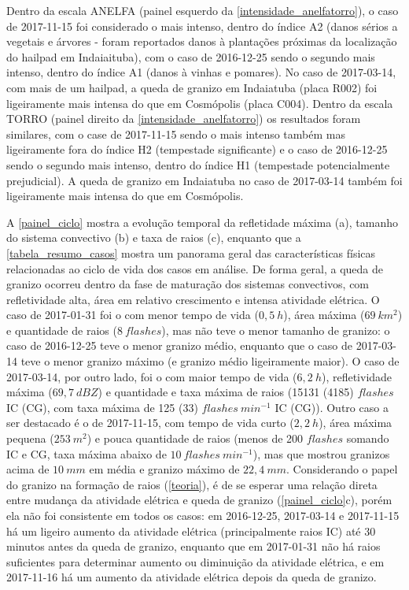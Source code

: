 Dentro da escala ANELFA (painel esquerdo da \autoref{intensidade_anelfatorro}), o caso de 2017-11-15 foi considerado o mais intenso, dentro do índice A2 (danos sérios a vegetais e árvores - foram reportados danos à plantações próximas da localização do hailpad em Indaiaituba), com o caso de 2016-12-25 sendo o segundo mais intenso, dentro do índice A1 (danos à vinhas e pomares). No caso de 2017-03-14, com mais de um hailpad, a queda de granizo em Indaiatuba (placa R002) foi ligeiramente mais intensa do que em Cosmópolis (placa C004). Dentro da escala TORRO (painel direito da \autoref{intensidade_anelfatorro}) os resultados foram similares, com o case de 2017-11-15 sendo o mais intenso também mas ligeiramente fora do índice H2 (tempestade significante) e o caso de 2016-12-25 sendo o segundo mais intenso, dentro do índice H1 (tempestade potencialmente prejudicial). A queda de granizo em Indaiatuba no caso de 2017-03-14 também foi ligeiramente mais intensa do que em Cosmópolis.

A \autoref{painel_ciclo} mostra a evolução temporal da refletidade máxima (a), tamanho do sistema convectivo (b) e taxa de raios (c), enquanto que a \autoref{tabela_resumo_casos} mostra um panorama geral das características físicas relacionadas ao ciclo de vida dos casos em análise. De forma geral, a queda de granizo ocorreu dentro da fase de maturação dos sistemas convectivos, com refletividade alta, área em relativo crescimento e intensa atividade elétrica. O caso de 2017-01-31 foi o com menor tempo de vida ($0,5\:h$), área máxima ($69\:km^2$) e quantidade de raios ($8\:flashes$), mas não teve o menor tamanho de granizo: o caso de 2016-12-25 teve o menor granizo médio, enquanto que o caso de 2017-03-14 teve o menor granizo máximo (e granizo médio ligeiramente maior). O caso de 2017-03-14, por outro lado, foi o com maior tempo de vida ($6,2\:h$), refletividade máxima ($69,7\:dBZ$) e quantidade e taxa máxima de raios (15131 (4185) $flashes$ IC (CG), com taxa máxima de 125 (33) $flashes\:min^{-1}$ IC (CG)). Outro caso a ser destacado é o de 2017-11-15, com tempo de vida curto ($2,2\:h$), área máxima pequena ($253\:m^2$) e pouca quantidade de raios (menos de 200 $flashes$ somando IC e CG, taxa máxima abaixo de $10\:flashes\:min^{-1}$), mas que mostrou granizos acima de $10\:mm$ em média e granizo máximo de $22,4\:mm$. Considerando o papel do granizo na formação de raios (\autoref{teoria}), é de se esperar uma relação direta entre mudança da atividade elétrica e queda de granizo (\autoref{painel_ciclo}c), porém ela não foi consistente em todos os casos: em 2016-12-25, 2017-03-14 e 2017-11-15 há um ligeiro aumento da atividade elétrica (principalmente raios IC) até 30 minutos antes da queda de granizo, enquanto que em 2017-01-31 não há raios suficientes para determinar aumento ou diminuição da atividade elétrica, e em 2017-11-16 há um aumento da atividade elétrica depois da queda de granizo.

